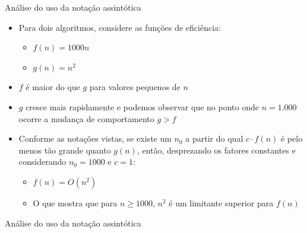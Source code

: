 \documentclass{beamer}
\begin{document}
\begin{frame}{Análise do uso da notação assintótica}

\begin{itemize}
 \item Para dois algoritmos, considere as funções de eficiência:
 \begin{itemize}
  \item $f(n) = 1000n$
  \item $g(n) = n^2$
 \end{itemize}
\item $f$ é maior do que $g$ para valores pequenos de $n$
\item $g$ cresce mais rapidamente e podemos observar que no ponto onde $n= 1.000$ ocorre a mudança de comportamento $ g > f$
\item Conforme as notações vistas, se existe um $n_0$ a partir do qual $c
\cdot f(n)$ é pelo menos tão grande quanto $g(n)$, então, desprezando os fatores constantes e considerando $n_0 =1000$ e $c = 1$:
\begin{itemize}
 \item $f(n) = O(n^2)$
 \item O que mostra que para $n \geq 1000$, $n^2$ é um limitante superior para $f(n)$
\end{itemize}

\end{itemize}

\end{frame}


\begin{frame}{Análise do uso da notação assintótica}
\end{frame}
\end{document}
